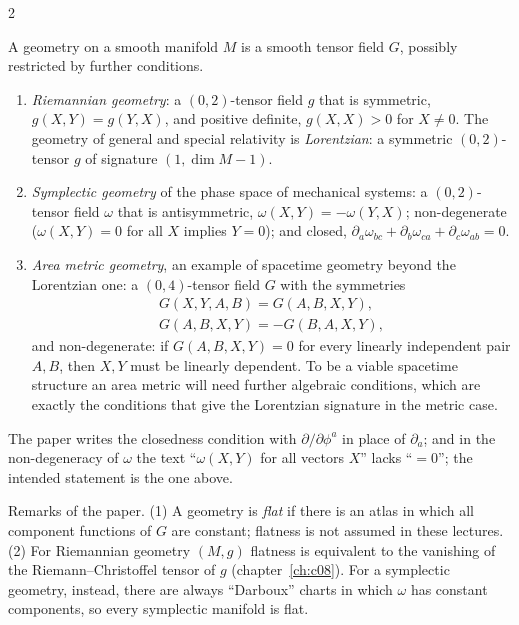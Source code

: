 \begin{paracol}{2}
\begin{definition}\label{def:c29-geometry}
A geometry on a smooth manifold $M$ is a smooth tensor field $G$, possibly restricted by further conditions.
\end{definition}

\begin{example}\label{ex:c29-geometries}
\begin{enumerate}
  \item \emph{Riemannian geometry}: a $(0,2)$-tensor field $g$ that is symmetric, $g(X,Y)=g(Y,X)$, and positive definite, $g(X,X)>0$ for $X\ne0$. The geometry of general and special relativity is \emph{Lorentzian}: a symmetric $(0,2)$-tensor $g$ of signature $(1,\dim M-1)$.
  \item \emph{Symplectic geometry} of the phase space of mechanical systems: a $(0,2)$-tensor field $\omega$ that is antisymmetric, $\omega(X,Y)=-\omega(Y,X)$; non-degenerate ($\omega(X,Y)=0$ for all $X$ implies $Y=0$); and closed, $\partial_a\omega_{bc}+\partial_b\omega_{ca}+\partial_c\omega_{ab}=0$.
  \item \emph{Area metric geometry}, an example of spacetime geometry beyond the Lorentzian one: a $(0,4)$-tensor field $G$ with the symmetries
  \begin{gather*}
    G(X,Y,A,B)=G(A,B,X,Y),\\ G(A,B,X,Y)=-G(B,A,X,Y),
  \end{gather*}
  and non-degenerate: if $G(A,B,X,Y)=0$ for every linearly independent pair $A,B$, then $X,Y$ must be linearly dependent. To be a viable spacetime structure an area metric will need further algebraic conditions, which are exactly the conditions that give the Lorentzian signature in the metric case.
\end{enumerate}
\end{example}
\begin{coursenote}
The paper writes the closedness condition with $\partial/\partial\phi^a$ in place of $\partial_a$; and in the non-degeneracy of $\omega$ the text ``$\omega(X,Y)$ for all vectors $X$'' lacks ``$=0$''; the intended statement is the one above.
\end{coursenote}

Remarks of the paper. (1) A geometry is \emph{flat} if there is an atlas in which all component functions of $G$ are constant; flatness is not assumed in these lectures. (2) For Riemannian geometry $(M,g)$ flatness is equivalent to the vanishing of the Riemann--Christoffel tensor of $g$ (chapter~\ref{ch:c08}). For a symplectic geometry, instead, there are always ``Darboux'' charts in which $\omega$ has constant components, so every symplectic manifold is flat.


\end{paracol}
